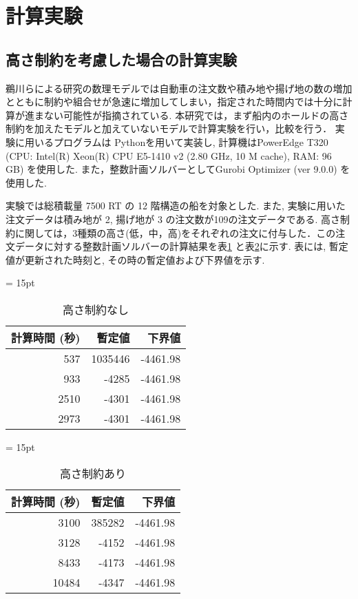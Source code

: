 \documentclass[a4j,11pt,twocolumn]{jsarticle}
\begin{document}
\newpage


\section{計算実験}
\subsection{高さ制約を考慮した場合の計算実験}
鵜川らによる研究の数理モデルでは自動車の注文数や積み地や揚げ地の数の増加とともに制約や組合せが急速に増加してしまい，指定された時間内では十分に計算が進まない可能性が指摘されている.\cite{ukawa}
本研究では，まず船内のホールドの高さ制約を加えたモデルと加えていないモデルで計算実験を行い，比較を行う．
実験に用いるプログラムは Pythonを用いて実装し, 計算機はPowerEdge T320 (CPU: Intel(R) Xeon(R) CPU E5-1410 v2 (2.80 GHz, 10 M cache), RAM: 96 GB) を使用した. また，整数計画ソルバーとしてGurobi Optimizer (ver 9.0.0) を使用した.

実験では総積載量 7500 RT の 12 階構造の船を対象とした.  また, 実験に用いた注文データは積み地が 2, 揚げ地が 3 の注文数が109の注文データである. 高さ制約に関しては，3種類の高さ(低，中，高)をそれぞれの注文に付与した．この注文データに対する整数計画ソルバーの計算結果を表\ref{withoutHeight} と表\ref{Height}に示す. 表には, 暫定値が更新された時刻と, その時の暫定値および下界値を示す.

\begin{table}[htbp]
 \centering
 \tabcolsep = 15pt
 \renewcommand{\arraystretch}{0.8}
 \caption{高さ制約なし}
 \label{withoutHeight}
 \begin{tabular}{rrr} \hline
  計算時間 (秒) & 暫定値 & 下界値 \\ \hline
  537 &    1035446 & -4461.98 \\
  933 &    -4285 & -4461.98 \\
  2510 &    -4301 & -4461.98 \\
  2973 & -4301 & -4461.98 \\ \hline
 \end{tabular}
\end{table}

\newpage

\begin{table}[htbp]
 \centering
 \tabcolsep = 15pt
 \renewcommand{\arraystretch}{0.8}
 \caption{高さ制約あり}
 \label{Height}
 \begin{tabular}{rrr} \hline
  計算時間 (秒) & 暫定値 & 下界値 \\ \hline
  3100 &    385282 & -4461.98 \\
  3128 &    -4152 & -4461.98 \\
  8433 &    -4173 & -4461.98 \\
  10484 & -4347 & -4461.98 \\ \hline
 \end{tabular}
\end{table}
\end{document}
